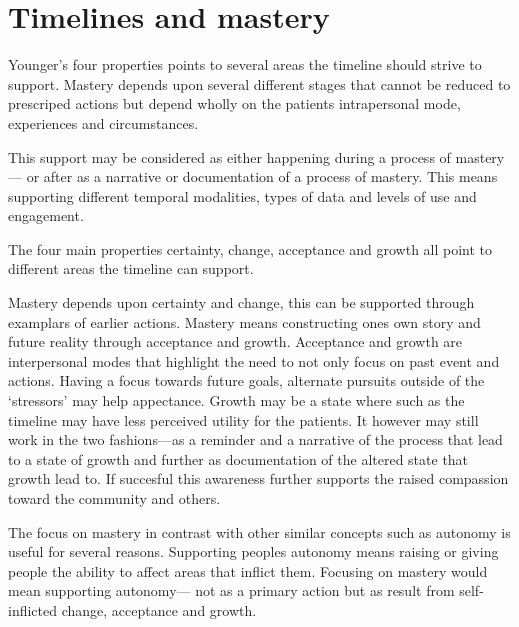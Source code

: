 \documentclass[11pt,UKenglish, a4paper]{article}
\begin{document}
\section{Timelines and mastery}

Younger's four properties points to several areas the timeline should strive to support. Mastery depends upon several different stages that cannot be reduced to prescriped actions but depend wholly on the patients intrapersonal mode, experiences and circumstances.

This support may be considered as either happening during a process of mastery--- or after as a narrative or documentation of a process of mastery. This means supporting different temporal modalities, types of data and levels of use and engagement.   

The four main properties certainty, change, acceptance and growth all point to different areas the timeline can support. 

Mastery depends upon certainty and change, this can be supported through examplars of earlier actions. Mastery means constructing ones own story and future reality through acceptance and growth. Acceptance and growth are interpersonal modes that highlight the need to not only focus on past event and actions. Having a focus towards future goals, alternate pursuits outside of the `stressors' may help appectance. Growth may be a state where such as the timeline may have less perceived utility for the patients. It however may still work in the two fashions---as a reminder and a narrative of the process that lead to a state of growth and further as documentation of the altered state that growth lead to. If succesful this awareness further supports the raised compassion toward the community and others. 

The focus on mastery in contrast with other similar concepts such as autonomy is useful for several reasons. Supporting peoples autonomy means raising or giving people the ability to affect areas that inflict them. Focusing on mastery would mean supporting autonomy--- not as a primary action but as result from self-inflicted change, acceptance and growth.
\end{document}
